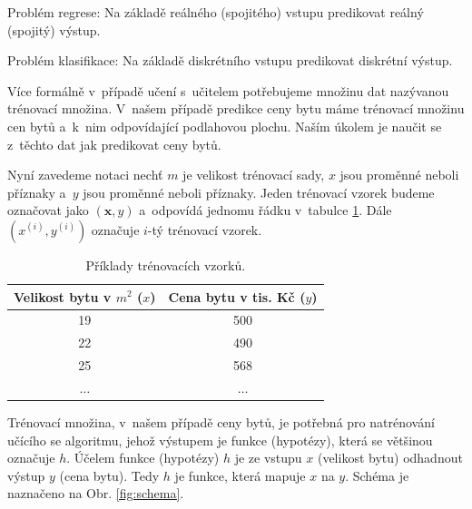 \par{Problém regrese: Na základě reálného (spojitého) vstupu predikovat reálný (spojitý) výstup.}

\par{Problém klasifikace: Na základě diskrétního vstupu predikovat diskrétní výstup.}

\par{Více formálně v~případě učení s~učitelem potřebujeme množinu dat nazývanou trénovací množina. V~našem případě predikce ceny bytu máme trénovací množinu cen bytů a~k~nim odpovídající podlahovou plochu. Naším úkolem je naučit se z~těchto dat jak predikovat ceny bytů.}

\par{Nyní zavedeme notaci nechť $m$ je velikost trénovací sady, $x$ jsou  proměnné neboli příznaky a~$y$ jsou  proměnné neboli příznaky. Jeden trénovací vzorek budeme označovat jako $\left(\bm{x}, y \right)$ a~odpovídá jednomu řádku v~tabulce \ref{tab:vzorky}. Dále $\left( x^{\left( i \right)}, y^{\left( i \right)} \right)$ označuje $i$-tý trénovací vzorek.}

\begin{table}[!ht]
\centering
\begin{tabular}{c|c}
	{Velikost bytu v $m^2$ ($x$)} & {Cena bytu v tis. Kč ($y$)}\\
	\hline
	{19} & {500}\\
	{22} & {490}\\
	{25} & {568}\\
	{$\ldots$} & {$\ldots$}
\end{tabular}
\caption{Příklady trénovacích vzorků.}
\label{tab:vzorky}
\end{table}

\par{Trénovací množina, v~našem případě ceny bytů, je potřebná pro natrénování učícího se algoritmu, jehož výstupem je funkce (hypotézy), která se většinou označuje $h$. Účelem funkce (hypotézy) $h$ je ze vstupu $x$ (velikost bytu) odhadnout výstup $y$ (cena bytu). Tedy $h$ je funkce, která mapuje $x$ na $y$. Schéma je naznačeno na Obr. \ref{fig:schema}.}

